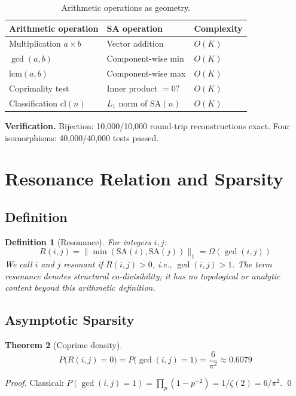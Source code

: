 \documentclass[10pt,twocolumn]{article}
\newtheorem{theorem}{Theorem}[section]
\newtheorem{definition}[theorem]{Definition}
\newcommand{\cl}{\mathrm{cl}}
\newcommand{\SA}{\mathrm{SA}}
\newcommand{\Om}{\Omega}
\begin{document}
\begin{table}[htbp]
\centering
\caption{Arithmetic operations as geometry.}
\small
\setlength{\tabcolsep}{4pt}
\begin{tabular}{@{}lll@{}}
\toprule
Arithmetic operation & SA operation & Complexity \\
\midrule
Multiplication $a \times b$  & Vector addition        & $O(K)$ \\
$\gcd(a, b)$                 & Component-wise min     & $O(K)$ \\
$\mathrm{lcm}(a, b)$         & Component-wise max     & $O(K)$ \\
Coprimality test             & Inner product $= 0?$   & $O(K)$ \\
Classification $\cl(n)$      & $L_1$ norm of $\SA(n)$ & $O(K)$ \\
\bottomrule
\end{tabular}
\end{table}

\noindent\textbf{Verification.} Bijection: 10{,}000/10{,}000 round-trip
reconstructions exact. Four isomorphisms: 40{,}000/40{,}000 tests passed.

\section{Resonance Relation and Sparsity}

\subsection{Definition}

\begin{definition}[Resonance]\label{def:resonance}
For integers $i, j$:
\[
R(i,j) = \|\min(\SA(i), \SA(j))\|_1 = \Om(\gcd(i,j))
\]
We call $i$ and $j$ \emph{resonant} if $R(i,j) > 0$, i.e.,
$\gcd(i,j) > 1$. The term \emph{resonance} denotes structural
co-divisibility; it has no topological or analytic content beyond this
arithmetic definition.
\end{definition}

\subsection{Asymptotic Sparsity}

\begin{theorem}[Coprime density]\label{thm:coprime-density}
\[
P\bigl(R(i,j) = 0\bigr)
= P\bigl(\gcd(i,j) = 1\bigr)
= \frac{6}{\pi^2} \approx 0.6079
\]
\end{theorem}
\begin{proof}
Classical:
$P(\gcd(i,j)=1) = \prod_p (1 - p^{-2}) = 1/\zeta(2) = 6/\pi^2$. \qed
\end{proof}
\end{document}
